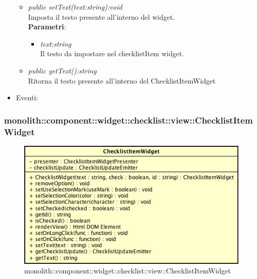 \begin{itemize}
\begin{itemize}
	\item \textit{public setText(text:string):void}\\
	Imposta il testo presente all'interno del widget.
		\\ \textbf{Parametri}: \begin{itemize}
		\item \textit{text:string}\\
		Il testo da impostare nel checklistItem widget.
		\end{itemize}
	\item \textit{public getText():string}\\
	Ritorna il testo presente all'interno del ChecklistItemWidget
	\end{itemize}
\item{Eventi}:
\end{itemize}

\subsubsection{monolith::component::widget::checklist::view::ChecklistItemWidget}

\label{monolith::component::widget::checklist::view::ChecklistItemWidget}
\begin{figure}[H]
	\centering
	\includegraphics[scale=0.5]{Sezioni/SottosezioniST/img/ChecklistItemWidget.png}
	\caption{monolith::component::widget::checklist::view::ChecklistItemWidget}
\end{figure}

